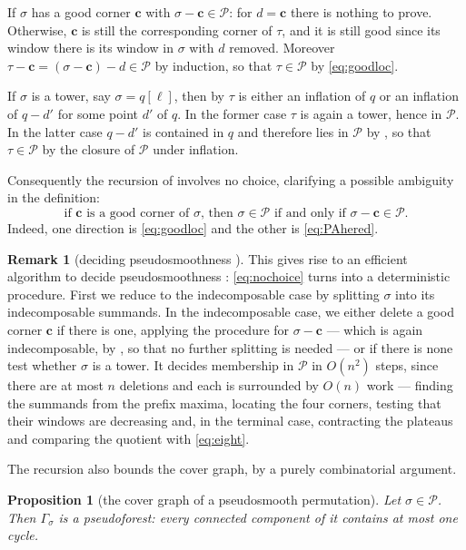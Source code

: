 \documentclass[12pt]{article}
\def\xspace{ }%
\newtheorem{proposition}[proposition]{Proposition}
\theoremstyle{definition}
\newtheorem{remark}[remark]{Remark}
\newcommand{\psm}{pseudosmooth\xspace}
\newcommand{\psmness}{pseudosmoothness\xspace}
\newcommand{\good}{good\xspace}
\newcommand{\PA}{\mathcal{P}}          %
\newcommand{\crn}{\mathbf{c}}              %
\newcommand{\cgr}{\Gamma}                 %
\begin{document}
If $\sigma$ has a \good corner $\crn$ with $\sigma - \crn \in \PA$: for $d = \crn$ there
is nothing to prove. Otherwise, $\crn$ is still the corresponding corner of $\tau$, and
it is still \good since its window there is its window in $\sigma$ with $d$ removed.
Moreover $\tau - \crn = (\sigma - \crn) - d \in \PA$ by induction, so that
$\tau\in\PA$ by \eqref{eq:goodloc}.

If $\sigma$ is a tower, say $\sigma=q[\ell]$, then by  $\tau$ is either an
inflation of $q$ or an inflation of $q-d'$ for some point $d'$ of $q$. In the former case $\tau$ is
again a tower, hence in $\PA$. In the latter case $q-d'$ is contained in $q$ and
therefore lies in $\PA$ by , so that $\tau \in\PA$ by the closure
of $\PA$ under inflation.



Consequently the recursion of  involves no choice, clarifying
a possible ambiguity in the definition:
\begin{equation}\label{eq:nochoice}
\text{if $\crn$ is a \good corner of $\sigma$, then $\sigma\in\PA$ if and
only if $\sigma - \crn \in \PA$.}
\end{equation}
Indeed, one direction is \eqref{eq:goodloc} and the other is
\eqref{eq:PAhered}.

\begin{remark}[deciding \psmness]\label{rem:algorithm}
This gives rise to an efficient algorithm to decide \psmness:
\eqref{eq:nochoice} turns  into a deterministic procedure.
First we reduce to the indecomposable case by splitting $\sigma$ into its indecomposable summands.
In the indecomposable case, we either delete a \good corner $\crn$ if there is one, applying the procedure
for $\sigma-\crn$ --- which is again indecomposable, by
, so that no further splitting is needed --- or if
there is none test whether $\sigma$ is a tower.
It decides membership in $\PA$ in $O(n^2)$ steps, since there are at most $n$ deletions and each is
surrounded by $O(n)$ work --- finding the summands from the prefix maxima,
locating the four corners, testing that their windows are decreasing and,
in the terminal case, contracting the plateaus and comparing the quotient
with \eqref{eq:eight}.
\end{remark}


The recursion also bounds the cover graph, by a purely combinatorial argument.

\begin{proposition}[the cover graph of a \psm permutation]\label{prop:PApf}
Let $\sigma \in \PA$. Then $\cgr_\sigma$ is a pseudoforest: every
connected component of it contains at most one cycle.
\end{proposition}
\end{document}
